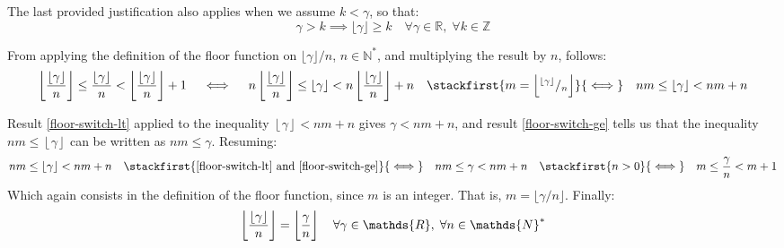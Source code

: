 The last provided justification
also applies when we assume $k < \gamma$,
so that:
\begin{equation}\label{floor-lt2ge-int}
  \gamma > k
  \implies
  \lfloor \gamma \rfloor \ge k
  \quad \forall \gamma \in \mathds{R}, \; \forall k \in \mathds{Z}
\end{equation}

From applying the definition of the floor function
on $\lfloor \gamma \rfloor / n$, $n \in \mathds{N}^*$,
and multiplying the result by $n$, follows:
\[
      \left\lfloor \dfrac{\lfloor \gamma \rfloor}{n} \right\rfloor
    \le
      \dfrac{\left\lfloor \gamma \right\rfloor}{n}
    <
      \left\lfloor \dfrac{\lfloor \gamma \rfloor}{n} \right\rfloor
      + 1
  \quad\iff\quad
      n \left\lfloor \dfrac{\lfloor \gamma \rfloor}{n} \right\rfloor
    \le
      \left\lfloor \gamma \right\rfloor
    <
      n \left\lfloor \dfrac{\lfloor \gamma \rfloor}{n} \right\rfloor
      + n
  \quad\stackfirst{
    m =
    \left\lfloor
      {}^{\scriptstyle\lfloor \gamma \rfloor} / {}_{\scriptstyle n}
    \right\rfloor
  }{\iff}\quad
    n m \le \left\lfloor \gamma \right\rfloor < n m + n
\]

Result \eqref{floor-switch-lt}
applied to the inequality $\left\lfloor \gamma \right\rfloor < n m + n$
gives $\gamma < n m + n$,
and result \eqref{floor-switch-ge} tells us that
the inequality $n m \le \left\lfloor \gamma \right\rfloor$
can be written as $n m \le \gamma$.
Resuming:
\[
  n m \le \left\lfloor \gamma \right\rfloor < n m + n
  \quad\stackfirst{\eqref{floor-switch-lt}\text{ and }
                   \eqref{floor-switch-ge}}{\iff}\quad
  n m \le \gamma < n m + n
  \quad\stackfirst{n > 0}{\iff}\quad
  m \le \dfrac{\gamma}{n} < m + 1
\]
Which again consists in the definition of the floor function,
since $m$ is an integer.
That is, $m = \lfloor \gamma / n \rfloor$.
Finally:
\begin{equation}\label{floor-nested-ratio}
  \left\lfloor \dfrac{\lfloor \gamma \rfloor}{n} \right\rfloor
  =
  \left\lfloor \dfrac{\gamma\vphantom{l}}{n} \right\rfloor
  \quad \forall \gamma \in \mathds{R}, \; \forall n \in \mathds{N}^*
\end{equation}
